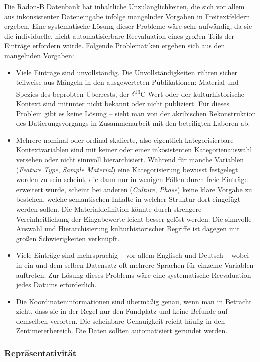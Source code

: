 \documentclass[openany,twoside,twocolumn]{book}
\providecommand{\tightlist}{%
  \setlength{\itemsep}{0pt}\setlength{\parskip}{0pt}}
\begin{document}
Die Radon-B Datenbank hat inhaltliche Unzulänglichkeiten, die sich vor allem aus inkonsistenter Dateneingabe infolge mangelnder Vorgaben in Freitextfeldern ergeben. Eine systematische Lösung dieser Probleme wäre sehr aufwändig, da sie die individuelle, nicht automatisierbare Reevaluation eines großen Teils der Einträge erfordern würde. Folgende Problematiken ergeben sich aus den mangelnden Vorgaben:

\begin{itemize}
\tightlist
\item
  Viele Einträge sind unvollständig. Die Unvollständigkeiten rühren sicher teilweise aus Mängeln in den ausgewerteten Publikationen: Material und Spezies des beprobten Überrests, der \(\delta\)\textsuperscript{13}C Wert oder der kulturhistorische Kontext sind mitunter nicht bekannt oder nicht publiziert. Für dieses Problem gibt es keine Lösung -- sieht man von der akribischen Rekonstruktion des Datierungsvorgangs in Zusammenarbeit mit den beteiligten Laboren ab.
\item
  Mehrere nominal oder ordinal skalierte, also eigentlich kategorisierbare Kontextvariablen sind mit keiner oder einer inkosistenten Kategorienauswahl versehen oder nicht sinnvoll hierarchisiert. Während für manche Variablen (\emph{Feature Type}, \emph{Sample Material}) eine Kategorisierung bewusst festgelegt worden zu sein scheint, die dann nur in wenigen Fällen durch freie Einträge erweitert wurde, scheint bei anderen (\emph{Culture}, \emph{Phase}) keine klare Vorgabe zu bestehen, welche semantischen Inhalte in welcher Struktur dort eingefügt werden sollen. Die Materialdefinition könnte durch strengere Vereinheitlichung der Eingabewerte leicht besser gelöst werden. Die sinnvolle Auswahl und Hierarchisierung kulturhistorischer Begriffe ist dagegen mit großen Schwierigkeiten verknüpft.
\item
  Viele Einträge sind mehrsprachig -- vor allem Englisch und Deutsch -- wobei in ein und dem selben Datensatz oft mehrere Sprachen für einzelne Variablen auftreten. Zur Lösung dieses Problems wäre eine systematische Reevaluation jedes Datums erforderlich.
\item
  Die Koordinateninformationen sind übermäßig genau, wenn man in Betracht zieht, dass sie in der Regel nur den Fundplatz und keine Befunde auf demselben verorten. Die scheinbare Genauigkeit reicht häufig in den Zentimeterbereich. Die Daten sollten automatisiert gerundet werden.
\end{itemize}

\hypertarget{representativity}{%
\subsubsection{Repräsentativität}\label{representativity}}
\end{document}
